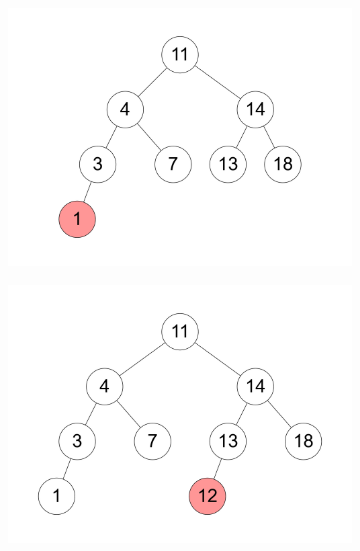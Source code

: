 \documentclass[11pt,a4paper]{article}
\begin{document}
\begin{loesung}
\begin{enumerate}
\begin{figure}[h!]
\begin{subfigure}[b]{0.3\textwidth}
                \includegraphics[width=\textwidth]{img/2d_6}
            \end{subfigure}
            \begin{subfigure}[b]{0.3\textwidth}
                \centering
                \includegraphics[width=\textwidth]{img/2d_7}
            \end{subfigure}
        \end{figure}
        \FloatBarrier


\end{enumerate}
\end{loesung}
\end{document}
